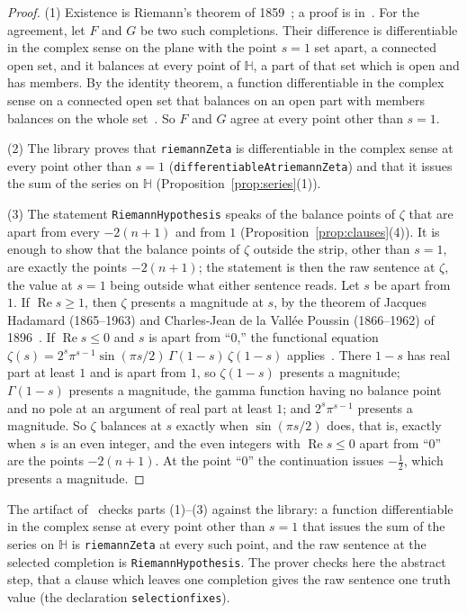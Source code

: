 \documentclass[11pt]{article}
\theoremstyle{definition}
\theoremstyle{remark}
\newcommand{\re}{\operatorname{Re}}
\newcommand{\Hp}{\mathbb H}
\DeclareRobustCommand{\lean}[1]{{\renewcommand{\_}{\textunderscore\allowbreak}\texttt{#1}}}
\begin{document}
\begin{proof}
(1) Existence is Riemann's theorem of 1859~\citep{riemann}; a proof is in~\citet[ch.~2]{titchmarsh}. For the agreement, let $F$ and $G$ be two such completions. Their difference is differentiable in the complex sense on the plane with the point $s=1$ set apart, a connected open set, and it balances at every point of $\Hp$, a part of that set which is open and has members. By the identity theorem, a function differentiable in the complex sense on a connected open set that balances on an open part with members balances on the whole set~\citep[ch.~4, \S3.2]{ahlfors}. So $F$ and $G$ agree at every point other than $s=1$.

(2) The library proves that \lean{riemannZeta} is differentiable in the complex sense at every point other than $s=1$ (\lean{differentiableAt\_riemannZeta}) and that it issues the sum of the series on $\Hp$ (Proposition~\ref{prop:series}(1)).

(3) The statement \lean{RiemannHypothesis} speaks of the balance points of $\zeta$ that are apart from every $-2(n+1)$ and from $1$ (Proposition~\ref{prop:clauses}(4)). It is enough to show that the balance points of $\zeta$ outside the strip, other than $s=1$, are exactly the points $-2(n+1)$; the statement is then the raw sentence at $\zeta$, the value at $s=1$ being outside what either sentence reads. Let $s$ be apart from $1$. If $\re s\ge1$, then $\zeta$ presents a magnitude at $s$, by the theorem of Jacques Hadamard (1865--1963) and Charles-Jean de la Vall\'ee Poussin (1866--1962) of 1896~\citep{hadamard96,vallee96}. If $\re s\le 0$ and $s$ is apart from ``0,'' the functional equation $\zeta(s)=2^{s}\pi^{s-1}\sin(\pi s/2)\,\Gamma(1-s)\,\zeta(1-s)$ applies~\citep[ch.~2]{titchmarsh}. There $1-s$ has real part at least $1$ and is apart from $1$, so $\zeta(1-s)$ presents a magnitude; $\Gamma(1-s)$ presents a magnitude, the gamma function having no balance point and no pole at an argument of real part at least $1$; and $2^{s}\pi^{s-1}$ presents a magnitude. So $\zeta$ balances at $s$ exactly when $\sin(\pi s/2)$ does, that is, exactly when $s$ is an even integer, and the even integers with $\re s\le0$ apart from ``0'' are the points $-2(n+1)$. At the point ``0'' the continuation issues $-\tfrac12$, which presents a magnitude.
\end{proof}

\noindent The artifact of~\citet{tv} checks parts (1)--(3) against the library: a function differentiable in the complex sense at every point other than $s=1$ that issues the sum of the series on $\Hp$ is \lean{riemannZeta} at every such point, and the raw sentence at the selected completion is \lean{RiemannHypothesis}. The prover checks here the abstract step, that a clause which leaves one completion gives the raw sentence one truth value (the declaration \lean{selection\_fixes}).
\end{document}
